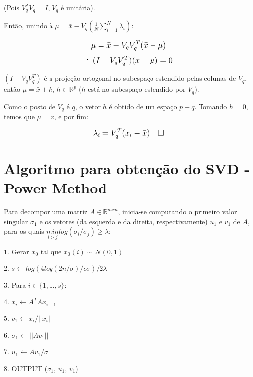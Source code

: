 \documentclass{article}
\begin{document}
(Pois $V_q^T V_q = I$, $V_q$ é unitária).

Então, unindo à $\mu = \bar{x} - V_q(\frac{1}{N} \sum_{i=1}^N \lambda_i)$:

\begin{equation}
\mathlarger{
\mu = \bar{x} - V_q V_q^T (\bar{x} - \mu)
}
\end{equation}
\begin{equation}
    \mathlarger{
\therefore (I - V_q V_q^T) (\bar{x} - \mu) = 0
}
\end{equation}

$(I - V_q V_q^T)$ é a projeção ortogonal no subespaço estendido pelas colunas de $V_q$, então $\mu = \bar{x} + h$, $h \in \mathbb{R}^p$ ($h$ está no subespaço estendido por $V_q$).

Como o posto de $V_q$ é $q$, o vetor $h$ é obtido de um espaço $p-q$. Tomando $h=0$, temos que $\mu = \bar{x}$, e por fim:

\begin{equation}
\mathlarger{
\lambda_i = V_q^T(x_i - \bar{x}) \quad \square
}
\end{equation}

\pagebreak

\section{Algoritmo para obtenção do SVD - Power Method}

\hfill

Para decompor uma matriz $A \in \mathbb{R}^{mxn}$, inicia-se computando o primeiro valor singular $\sigma_1$ e os vetores (da esquerda e da direita, respectivamente) $u_1$ e $v_1$ de $A$, para os quais $\underset{i>j}{min} log(\sigma_i/ \sigma_j) \geq \lambda$:

1. Gerar $x_0$ tal que $x_0(i) \sim \mathcal{N}(0,1)$

2. $s \leftarrow log(4log(2n/\sigma)/\epsilon \sigma)/2\lambda$

3. Para $i \in \{ 1, ..., s \}: $

4.      $x_i \leftarrow A^TAx_{i-1}$

5. $v_1 \leftarrow x_i / ||x_i||$

6. $\sigma_1 \leftarrow ||Av_1||$

7. $u_1 \leftarrow Av_1 / \sigma$

8. OUTPUT ($\sigma_1$, $u_1$, $v_1$)

\hfill


\hfill
\end{document}
